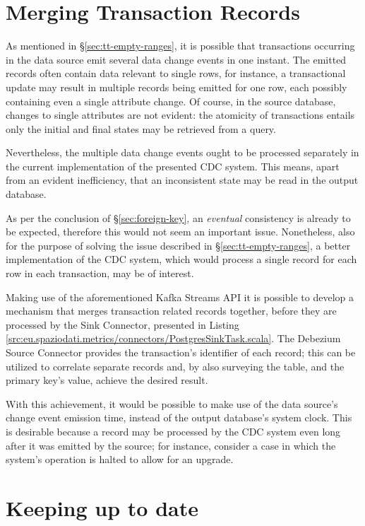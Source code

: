 \section{Merging Transaction Records}
\label{sec:squashing-transactions}

As mentioned in \S \ref{sec:tt-empty-ranges}, it is possible that transactions occurring in the data source emit several data change events in one instant.
The emitted records often contain data relevant to single rows, for instance, a transactional update may result in multiple records being emitted for one row, each possibly containing even a single attribute change.
Of course, in the source database, changes to single attributes are not evident: the atomicity of transactions entails only the initial and final states may be retrieved from a query.

Nevertheless, the multiple data change events ought to be processed separately in the current implementation of the presented CDC system.
This means, apart from an evident inefficiency, that an inconsistent state may be read in the output database.

As per the conclusion of \S \ref{sec:foreign-key}, an \emph{eventual} consistency is already to be expected, therefore this would not seem an important issue.
Nonetheless, also for the purpose of solving the issue described in \S \ref{sec:tt-empty-ranges}, a better implementation of the CDC system, which would process a single record for each row in each transaction, may be of interest.

Making use of the aforementioned Kafka Streams API it is possible to develop a mechanism that merges transaction related records together, before they are processed by the Sink Connector, presented in Listing \ref{src:eu.spaziodati.metrics/connectors/PostgresSinkTask.scala}.
The Debezium Source Connector provides the transaction's identifier of each record; this can be utilized to correlate separate records and, by also surveying the table, and the primary key's value, achieve the desired result.

With this achievement, it would be possible to make use of the data source's change event emission time, instead of the output database's system clock.
This is desirable because a record may be processed by the CDC system even long after it was emitted by the source; for instance, consider a case in which the system's operation is halted to allow for an upgrade.


\section{Keeping up to date}

